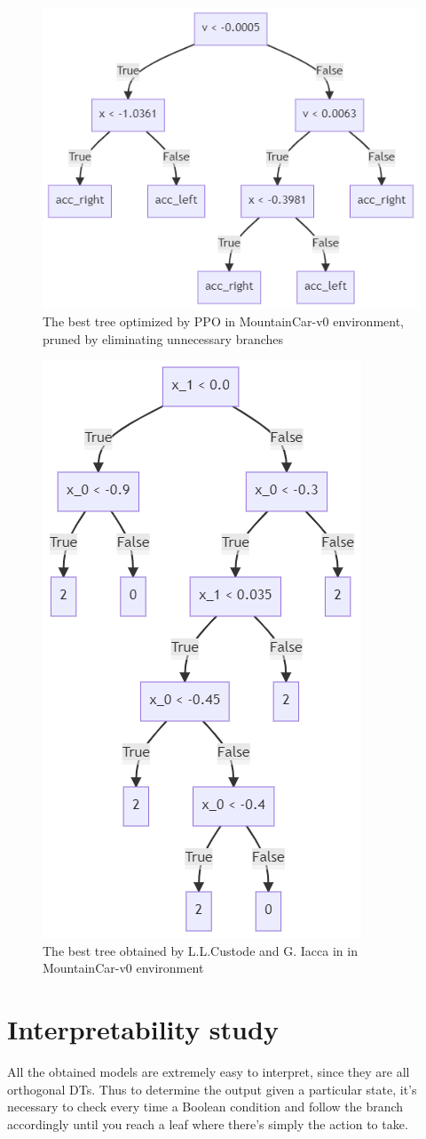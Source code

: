 \newpage

\begin{figure}[h!]
    \centering
    \includegraphics[width=0.5\linewidth]{images/MountainCar/bestPPOprunedMC.png}
    \caption{The best tree optimized by PPO in MountainCar-v0 environment, pruned by eliminating unnecessary branches}
    \label{fig:BestTreeMC}
\end{figure}

\newpage

\begin{figure}[h!]
    \centering
    \includegraphics[width=0.4\linewidth]{images/MountainCar/bestLLCMC.png}
    \caption{The best tree obtained by L.L.Custode and G. Iacca in \cite{custode} in MountainCar-v0 environment}
    \label{fig:BestTreeLLCMC}
\end{figure}





\section{Interpretability study}
\label{sec:440}
All the obtained models are extremely easy to interpret, since they are all orthogonal DTs. Thus to determine the output given a particular state, it's necessary to check every time a Boolean condition and follow the branch accordingly until you reach a leaf where there's simply the action to take.

